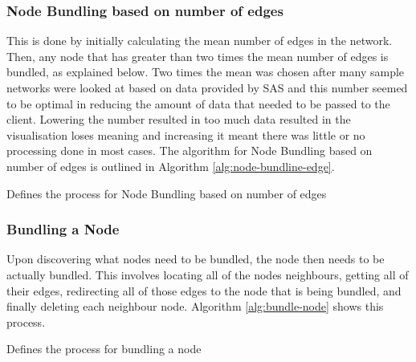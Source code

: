 \documentclass[../dissertation.tex]{subfiles}
\begin{document}
\subsubsection{Node Bundling based on number of edges}

This is done by initially calculating the mean number of edges in the network. Then, any node that has greater than two times the mean number of edges is bundled, as explained below. Two times the mean was chosen after many sample networks were looked at based on data provided by SAS and this number seemed to be optimal in reducing the amount of data that needed to be passed to the client. Lowering the number resulted in too much data resulted in the visualisation loses meaning and increasing it meant there was little or no processing done in most cases. The algorithm for Node Bundling based on number of edges is outlined in Algorithm \ref{alg:node-bundline-edge}.

\begin{algorithm}[H]
\caption{Defines the process for Node Bundling based on number of edges}
\label{alg:node-bundline-edge}
\begin{algorithmic}
 
\ENDFOR
{}
    \ENDIF
\ENDFOR
{} 
      
\ENDFOR
\end{algorithmic}
\end{algorithm}

\subsubsection{Bundling a Node}

Upon discovering what nodes need to be bundled, the node then needs to be actually bundled. This involves locating all of the nodes neighbours, getting all of their edges, redirecting all of those edges to the node that is being bundled, and finally deleting each neighbour node. Algorithm \ref{alg:bundle-node} shows this process.

\begin{algorithm}[H]
\caption{Defines the process for bundling a node}
\label{alg:bundle-node}
\begin{algorithmic}
 
        \ELSE
        \ENDIF
    \ENDFOR
\ENDFOR
{}
\ENDFOR
\end{algorithmic}
\end{algorithm}
\end{document}
